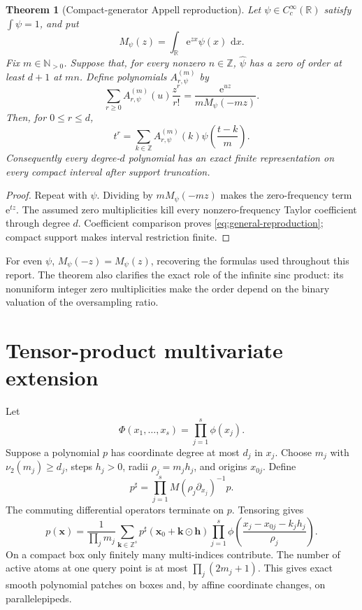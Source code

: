 \documentclass[11pt,oneside]{article}
\newtheorem{theorem}{Theorem}[section]
\theoremstyle{definition}
\theoremstyle{remark}
\newcommand{\R}{\mathbb R}
\newcommand{\N}{\mathbb N}
\newcommand{\Z}{\mathbb Z}
\newcommand{\vtwo}{\nu_2}
\newcommand{\dd}{\,\mathrm d}
\newcommand{\e}{\mathrm e}
\begin{document}
\begin{theorem}[Compact-generator Appell reproduction]
\label{thm:general-generator}
Let \(\psi\in C_c^\infty(\R)\) satisfy
\(\int\psi=1\), and put
\[
 M_\psi(z)=\int_\R \e^{zx}\psi(x)\,\dd x.
\]
Fix \(m\in\N_{>0}\).  Suppose that, for every nonzero \(n\in\Z\),
\(\widehat\psi\) has a zero of order at least \(d+1\) at \(mn\).  Define
polynomials \(A_{r,\psi}^{(m)}\) by
\begin{equation}
 \sum_{r\ge0}A_{r,\psi}^{(m)}(u)\frac{z^r}{r!}
 =\frac{\e^{uz}}{mM_\psi(-mz)}.
 \label{eq:general-appell}
\end{equation}
Then, for \(0\le r\le d\),
\begin{equation}
 t^r=\sum_{k\in\Z}A_{r,\psi}^{(m)}(k)
          \psi\!\left(\frac{t-k}{m}\right).
 \label{eq:general-reproduction}
\end{equation}
Consequently every degree-\(d\) polynomial has an exact finite representation
on every compact interval after support truncation.
\end{theorem}

\begin{proof}
Repeat  with \(\psi\).  Dividing by
\(mM_\psi(-mz)\) makes the zero-frequency term \(\e^{tz}\).  The assumed
zero multiplicities kill every nonzero-frequency Taylor coefficient through
degree \(d\).  Coefficient comparison proves
\eqref{eq:general-reproduction}; compact support makes interval restriction
finite.
\end{proof}

For even \(\psi\), \(M_\psi(-z)=M_\psi(z)\), recovering the formulas used
throughout this report.  The theorem also clarifies the exact role of the
infinite sinc product: its nonuniform integer zero multiplicities make the
order depend on the binary valuation of the oversampling ratio.

\section{Tensor-product multivariate extension}
\label{sec:multivariate}

Let
\[
 \Phi(x_1,\ldots,x_s)=\prod_{j=1}^{s}\phi(x_j).
\]
Suppose a polynomial \(p\) has coordinate degree at most \(d_j\) in \(x_j\).
Choose \(m_j\) with \(\vtwo(m_j)\ge d_j\), steps \(h_j>0\), radii
\(\rho_j=m_jh_j\), and origins \(x_{0j}\).  Define
\begin{equation}
 p^\sharp=
 \prod_{j=1}^{s}M(\rho_j\partial_{x_j})^{-1}p.
 \label{eq:multivariate-deconv}
\end{equation}
The commuting differential operators terminate on \(p\).  Tensoring
 gives
\begin{equation}
 p(\bm x)=
 \frac1{\prod_jm_j}
 \sum_{\bm k\in\Z^s}
 p^\sharp(\bm x_0+\bm k\odot\bm h)
 \prod_{j=1}^{s}
 \phi\!\left(\frac{x_j-x_{0j}-k_jh_j}{\rho_j}\right).
 \label{eq:multivariate-reproduction}
\end{equation}
On a compact box only finitely many multi-indices contribute.  The number of
active atoms at one query point is at most \(\prod_j(2m_j+1)\).  This gives
exact smooth polynomial patches on boxes and, by affine coordinate changes,
on parallelepipeds.
\end{document}
